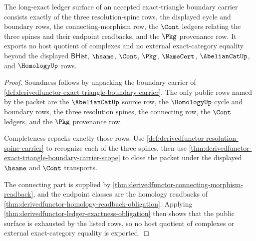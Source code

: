 \begin{theorem}\label{thm:derivedfunctor-long-exact-ledger-surface}
The long-exact ledger surface of an accepted exact-triangle boundary carrier consists exactly of the three resolution-spine rows, the displayed cycle and boundary rows, the connecting-morphism row, the $\Cont$ ledgers relating the three spines and their endpoint readbacks, and the $\Pkg$ provenance row. It exports no host quotient of complexes and no external exact-category equality beyond the displayed $\mathsf{BHist}$, $\hsame$, $\Cont$, $\Pkg$, $\NameCert$, $\AbelianCatUp$, and $\HomologyUp$ rows.
\end{theorem}
\begin{proof}
Soundness follows by unpacking the boundary carrier of \autoref{def:derivedfunctor-exact-triangle-boundary-carrier}. The only public rows named by the packet are the $\AbelianCatUp$ source row, the $\HomologyUp$ cycle and boundary rows, the three resolution spines, the connecting row, the $\Cont$ ledgers, and the $\Pkg$ provenance row.

Completeness repacks exactly those rows. Use \autoref{def:derivedfunctor-resolution-spine-carrier} to recognize each of the three spines, then use \autoref{thm:derivedfunctor-exact-triangle-boundary-carrier-scope} to close the packet under the displayed $\hsame$ and $\Cont$ transports.

The connecting part is supplied by \autoref{thm:derivedfunctor-connecting-morphism-readback}, and the endpoint classes are the homology readbacks of \autoref{thm:derivedfunctor-homology-readback-obligation}. Applying \autoref{thm:derivedfunctor-ledger-exactness-obligation} then shows that the public surface is exhausted by the listed rows, so no host quotient of complexes or external exact-category equality is exported.
\end{proof}


